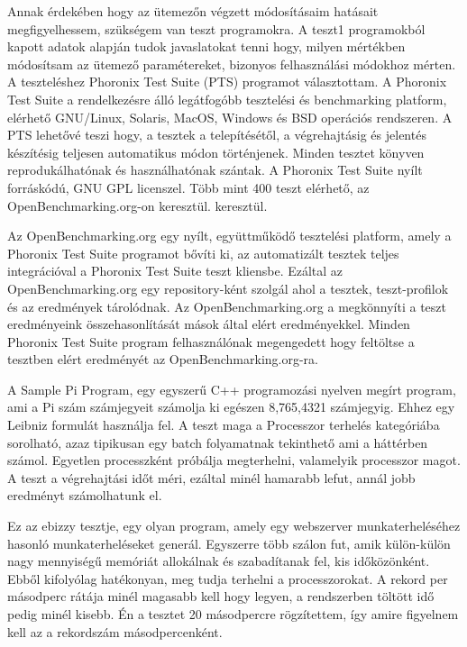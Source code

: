 
Annak érdekében hogy az ütemezőn végzett módosításaim hatásait megfigyelhessem, szükségem van teszt programokra. A teszt1 programokból kapott adatok alapján tudok javaslatokat tenni hogy, milyen mértékben módosítsam az ütemező paramétereket, bizonyos felhasználási módokhoz mérten.
A teszteléshez Phoronix Test Suite (PTS) programot választottam.
A Phoronix Test Suite a rendelkezésre álló legátfogóbb tesztelési és benchmarking platform, elérhető GNU/Linux, Solaris, MacOS, Windows és BSD operációs rendszeren.
A PTS lehetővé teszi hogy, a tesztek a telepítésétől, a végrehajtásig és jelentés készítésig teljesen automatikus módon történjenek.
Minden tesztet könyven reprodukálhatónak és használhatónak szántak.
A Phoronix Test Suite nyílt forráskódú, GNU GPL licenszel.
Több mint 400 teszt elérhető, az OpenBenchmarking.org-on keresztül. keresztül.


Az OpenBenchmarking.org egy nyílt, együttműködő tesztelési platform, amely a Phoronix Test Suite programot bővíti ki, az automatizált tesztek teljes integrációval a Phoronix Test Suite teszt kliensbe.
Ezáltal az OpenBenchmarking.org egy repository-ként szolgál ahol a tesztek, teszt-profilok és az eredmények tárolódnak.
Az OpenBenchmarking.org a megkönnyíti a teszt eredményeink összehasonlítását mások által elért eredményekkel.
Minden Phoronix Test Suite program felhasználónak megengedett hogy feltöltse a tesztben elért eredményét az OpenBenchmarking.org-ra.


A  Sample Pi Program, egy egyszerű C++ programozási nyelven megírt program, ami a Pi szám számjegyeit számolja ki egészen 8,765,4321 számjegyig. Ehhez egy Leibniz formulát használja fel. A teszt maga a Processzor terhelés kategóriába sorolható, azaz tipikusan egy batch folyamatnak tekinthető ami a háttérben számol. Egyetlen processzként próbálja megterhelni, valamelyik processzor magot. 
A teszt a végrehajtási időt méri, ezáltal minél hamarabb lefut, annál jobb eredményt számolhatunk el.

Ez az ebizzy tesztje, egy olyan program, amely egy webszerver munkaterheléséhez hasonló munkaterheléseket generál. Egyszerre több szálon fut, amik külön-külön nagy mennyiségű memóriát allokálnak és szabadítanak fel, kis időközönként. Ebből kifolyólag hatékonyan, meg tudja terhelni a processzorokat. A rekord per másodperc rátája minél magasabb kell hogy legyen, a rendszerben töltött idő pedig minél kisebb. Én a tesztet 20 másodpercre rögzítettem, így amire figyelnem kell az a rekordszám másodpercenként.


